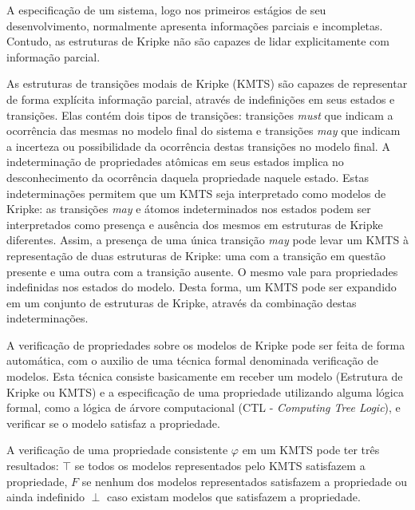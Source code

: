 \documentclass[normaltoc,capchap,capsec,times]{abnt}
\begin{document}
A especificação de um sistema, logo nos  primeiros estágios de seu desenvolvimento, normalmente apresenta informações parciais e incompletas. Contudo, as estruturas de Kripke não são capazes de lidar explicitamente com informação parcial. 

As estruturas de transições modais de Kripke (KMTS) são capazes de representar de forma explícita informação parcial, através de indefinições em seus estados e transições. Elas contém dois tipos de transições: transições \textit{must} que indicam a ocorrência das mesmas no modelo final do sistema e transições \textit{may} que indicam a incerteza ou possibilidade da ocorrência destas transições no modelo final. A  indeterminação de propriedades atômicas em seus estados implica no desconhecimento da ocorrência daquela propriedade naquele estado.  Estas indeterminações permitem que um KMTS seja interpretado como modelos de Kripke: as transições \textit{may} e átomos indeterminados nos estados podem ser interpretados como presença e ausência dos mesmos em estruturas de Kripke diferentes. Assim, a presença de uma única transição \textit{may} pode levar um KMTS à representação de duas estruturas de Kripke: uma com a transição em questão presente e uma outra com a transição ausente. O mesmo vale para propriedades indefinidas nos estados do modelo. Desta forma, um KMTS pode ser expandido em um conjunto de estruturas de Kripke, através da combinação destas indeterminações.


A verificação de propriedades sobre os modelos de Kripke pode ser feita de forma automática, com o auxilio de uma técnica formal denominada verificação de modelos. Esta técnica consiste basicamente em receber um modelo (Estrutura de Kripke ou KMTS) e a especificação de uma propriedade utilizando alguma lógica formal, como a lógica de árvore computacional (CTL - \textit{Computing Tree Logic}), e verificar se o modelo satisfaz a propriedade. 

A verificação de uma propriedade consistente $\varphi$ em um KMTS pode ter três resultados: $\top$ se todos os modelos representados pelo KMTS satisfazem a propriedade, $F$ se nenhum dos modelos representados satisfazem a propriedade ou ainda indefinido $\perp$  caso existam modelos que satisfazem a propriedade. %
\end{document}
